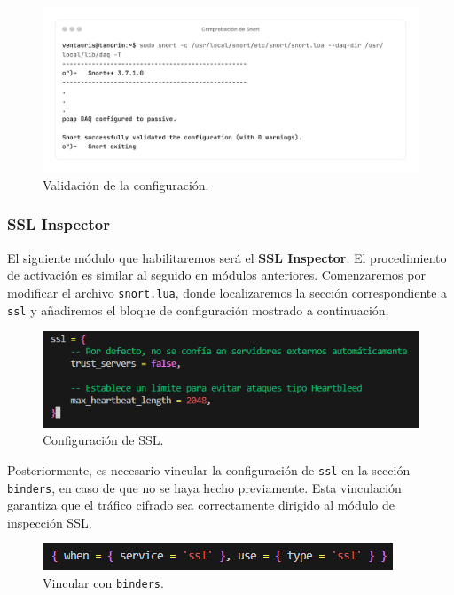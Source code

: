 \documentclass[11pt,a4paper,twoside]{report}
\begin{document}
\begin{figure}[H]
	\centering
	\includegraphics[scale=0.1]{http_inspect/6-6.png}
	\caption{Validación de la configuración.}
\end{figure}


\subsubsection*{SSL Inspector}

El siguiente módulo que habilitaremos será el \textbf{SSL Inspector}. El procedimiento de activación es similar al seguido en módulos anteriores. Comenzaremos por modificar el archivo \texttt{snort.lua}, donde localizaremos la sección correspondiente a \texttt{ssl} y añadiremos el bloque de configuración mostrado a continuación.

\begin{figure}[H]
	\centering
	\includegraphics[scale=0.8]{ssl_inspect/8.png}
	\caption{Configuración de SSL.}
\end{figure}

Posteriormente, es necesario vincular la configuración de \texttt{ssl} en la sección \texttt{binders}, en caso de que no se haya hecho previamente. Esta vinculación garantiza que el tráfico cifrado sea correctamente dirigido al módulo de inspección SSL.

\begin{figure}[H]
	\centering
	\includegraphics[scale=0.8]{ssl_inspect/9.png}
	\caption{Vincular con \texttt{binders}.}
\end{figure}
\end{document}
